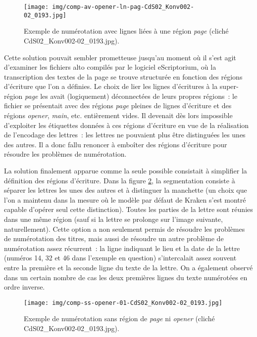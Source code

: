 \documentclass[a4paper,12pt,twoside]{book}
\begin{document}
				\begin{figure}[!h]
					\centering
					\texttt{[image: img/comp-av-opener-ln-pag-CdS02\_Konv002-02\_0193.jpg]}
					\caption{Exemple de numérotation avec lignes liées à une région \textit{page} (cliché CdS02\_Konv002-02\_0193.jpg).}
					\label{annotation-page-66}
				\end{figure}
				
				Cette solution pouvait sembler prometteuse jusqu'au moment où il s'est agit d'examiner les fichiers \gls{alto} compilés par le logiciel eScriptorium, où la transcription des textes de la page se trouve structurée en fonction des régions d'écriture que l'on a définies. Le choix de lier les lignes d'écritures à la super-région \textit{page} les avait (logiquement) déconnectées de leurs propres régions~: le fichier se présentait avec des régions \textit{page} pleines de lignes d'écriture et des régions \textit{opener}, \textit{main}, etc. entièrement vides. Il devenait dès lors impossible d'exploiter les étiquettes données à ces régions d'écriture en vue de la réalisation de l'encodage des lettres~: les lettres ne pouvaient plus être distinguées les unes des autres. Il a donc fallu renoncer à emboîter des régions d'écriture pour résoudre les problèmes de numérotation. 
				
				La solution finalement apparue comme la seule possible consistait à simplifier la définition des régions d'écriture. Dans la figure \ref{comp-ss-opener-193}, la segmentation consiste à séparer les lettres les unes des autres et à distinguer la manchette (un choix que l'on a maintenu dans la mesure où le modèle par défaut de Kraken s'est montré capable d'opérer seul cette distinction). Toutes les parties de la lettre sont réunies dans une même région (sauf si la lettre se prolonge sur l'image suivante, naturellement). Cette option a non seulement permis de résoudre les problèmes de numérotation des titres, mais aussi de résoudre un autre problème de numérotation assez récurrent~: la ligne indiquant le lieu et la date de la lettre (numéros 14, 32 et 46 dans l'exemple en question) s'intercalait assez souvent entre la première et la seconde ligne du texte de la lettre. On a également observé dans un certain nombre de cas les deux premières lignes du texte numérotées en ordre inverse.
				
				\begin{figure}[!h]
					\centering
					\texttt{[image: img/comp-ss-opener-01-CdS02\_Konv002-02\_0193.jpg]}
					\caption{Exemple de numérotation sans région de \textit{page} ni \textit{opener} (cliché CdS02\_Konv002-02\_0193.jpg).}
					\label{comp-ss-opener-193}
				\end{figure}
				
\end{document}
